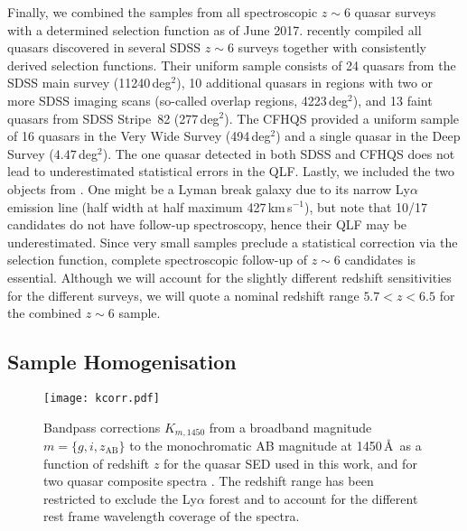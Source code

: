 \documentclass[fleqn,usenatbib]{mnras}
\begin{document}
Finally, we combined the samples from all spectroscopic $z\sim 6$
quasar surveys with a determined selection function as of June
2017. \citet{2016ApJ...833..222J} recently compiled all quasars
discovered in several SDSS $z\sim 6$ surveys together with
consistently derived selection functions. Their uniform sample
consists of 24 quasars from the SDSS main survey (11240\,deg$^2$), 10
additional quasars in regions with two or more SDSS imaging scans
(so-called overlap regions, 4223\,deg$^2$), and 13 faint quasars from
SDSS Stripe~82 (277\,deg$^2$). The CFHQS \citep{2010AJ....139..906W}
provided a uniform sample of 16 quasars in the Very Wide Survey
(494\,deg$^2$) and a single quasar in the Deep Survey
($4.47$\,deg$^2$). The one quasar detected in both SDSS and CFHQS does
not lead to underestimated statistical errors in the QLF. Lastly, we
included the two objects from \citet{2015ApJ...798...28K}. One might
be a Lyman break galaxy due to its narrow Ly$\alpha$ emission line
(half width at half maximum 427\,km\,s$^{-1}$), but
\citet{2015ApJ...798...28K} note that 10/17 candidates do not have
follow-up spectroscopy, hence their QLF may be underestimated. Since
very small samples preclude a statistical correction via the selection
function, complete spectroscopic follow-up of $z\sim 6$ candidates is
essential. Although we will account for the slightly different
redshift sensitivities for the different surveys, we will quote a
nominal redshift range $5.7<z<6.5$ for the combined $z\sim 6$ sample.

\subsection{Sample Homogenisation}
\label{sect:datahom}

\begin{figure}
  \texttt{[image: kcorr.pdf]}
  \caption{Bandpass corrections $K_{m,1450}$ from a broadband
    magnitude $m=\{g,i,z_\mathrm{AB}\}$ to the monochromatic AB
    magnitude at 1450\,\AA\ as a function of redshift $z$ for the
    \citet{2015MNRAS.449.4204L} quasar SED used in this work, and for
    two quasar composite spectra \citep{2001AJ....122..549V,
      2002ApJ...565..773T}.  The redshift range has been restricted to
    exclude the Ly$\alpha$ forest and to account for the different
    rest frame wavelength coverage of the spectra.}
  \label{fig:kcorr}
\end{figure}
\end{document}

